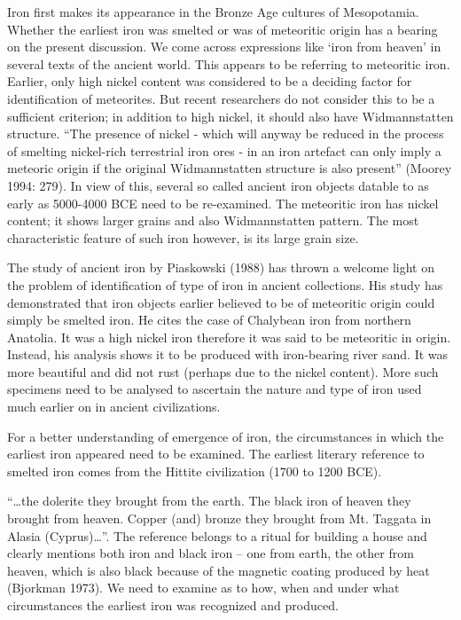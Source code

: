 Iron first makes its appearance in the Bronze Age cultures of Mesopotamia. Whether the earliest iron was smelted or was of meteoritic origin has a bearing on the present discussion. We come across expressions like ‘iron from heaven’ in several texts of the ancient world. This appears to be referring to meteoritic iron. Earlier, only high nickel content was considered to be a deciding factor for identification of meteorites. But recent researchers do not consider this to be a sufficient criterion; in addition to high nickel, it should also have Widmannstatten structure. “The presence of nickel - which will anyway be reduced in the process of smelting nickel-rich terrestrial iron ores - in an iron artefact can only imply a meteoric origin if the original Widmannstatten structure is also present” (Moorey 1994: 279). In view of this, several so called ancient iron objects datable to as early as 5000-4000 BCE need to be re-examined. The meteoritic iron has nickel content; it shows larger grains and also Widmannstatten pattern. The most characteristic feature of such iron however, is its large grain size.

The study of ancient iron by Piaskowski (1988) has thrown a welcome light on the problem of identification of type of iron in ancient collections. His study has demonstrated that iron objects earlier believed to be of meteoritic origin could simply be smelted iron. He cites the case of Chalybean iron from northern Anatolia. It was a high nickel iron therefore it was said to be meteoritic in origin. Instead, his analysis shows it to be produced with iron-bearing river sand. It was more beautiful and did not rust (perhaps due to the nickel content). More such specimens need to be analysed to ascertain the nature and type of iron used much earlier on in ancient civilizations.

For a better understanding of emergence of iron, the circumstances in which the earliest iron appeared need to be examined. The earliest literary reference to smelted iron comes from the Hittite civilization (1700 to 1200 BCE). 

{\footnotesize “…the dolerite they brought from the earth. The black iron of heaven they brought from heaven. Copper (and) bronze they brought from Mt. Taggata in Alasia (Cyprus)…”.} The reference belongs to a ritual for building a house and clearly mentions both iron and black iron – one from earth, the other from heaven, which is also black because of the magnetic coating produced by heat (Bjorkman 1973). We need to examine as to how, when and under what circumstances the earliest iron was recognized and produced. 

